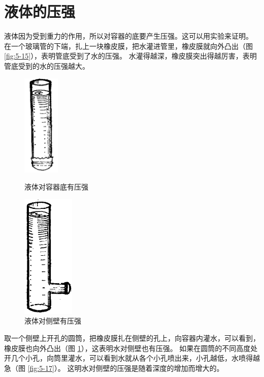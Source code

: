 \section{液体的压强}\label{sec:5-5}

液体因为受到重力的作用，所以对容器的底要产生压强。这可以用实验来证明。
在一个玻璃管的下端，扎上一块橡皮膜，把水灌进管里，橡皮膜就向外凸出（图 \ref{fig:5-15}），表明管底受到了水的压强。
水灌得越深，橡皮膜突出得越厉害，表明管底受到的水的压强越大。

\begin{figure}[htbp]
    \centering
    \begin{minipage}{7cm}
    \centering
    \vspace{3em}
    \includegraphics[width=1.75cm]{../pic/czwl1-ch5-15}
    \caption{液体对容器底有压强}\label{fig:5-15}
    \end{minipage}
    \qquad
    \begin{minipage}{7cm}
    \centering
    \includegraphics[width=2.5cm]{../pic/czwl1-ch5-16}
    \caption{液体对侧壁有压强}\label{fig:5-16}
    \end{minipage}
\end{figure}


取一个侧壁上开孔的圆筒，把橡皮膜扎在侧壁的孔上，向容器内灌水，可以看到，
橡皮膜也向外凸出（图 \ref{fig:5-16}），这表明水对侧壁也有压强。
如果在圆筒的不同高度处开几个小孔，向筒里灌水，可以看到水就从各个小孔喷出来，小孔越低，水喷得越急（图 \ref{fig:5-17}）。
这明水对侧壁的压强是随着深度的增加而增大的。

